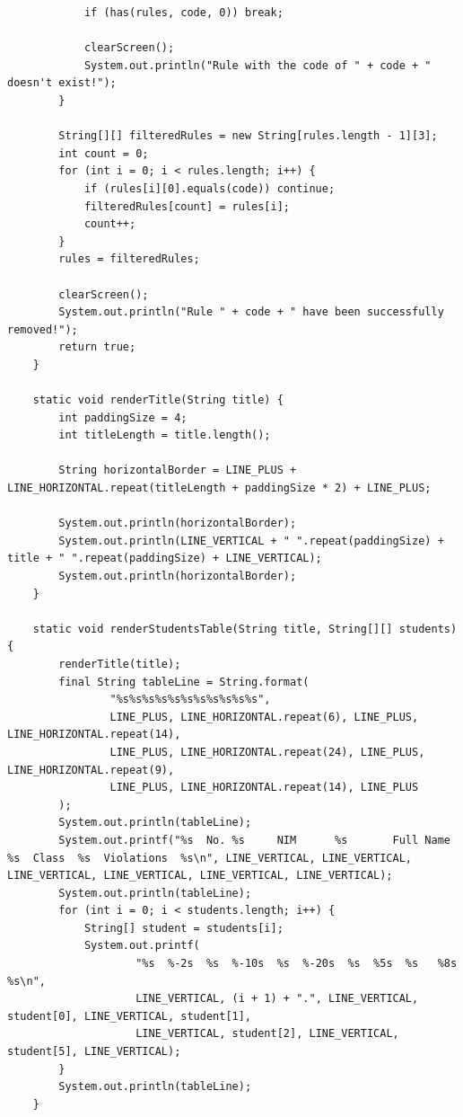 \documentclass[12pt,titlepage]{article}
\begin{document}
\begin{verbatim}
            if (has(rules, code, 0)) break;

            clearScreen();
            System.out.println("Rule with the code of " + code + " doesn't exist!");
        }

        String[][] filteredRules = new String[rules.length - 1][3];
        int count = 0;
        for (int i = 0; i < rules.length; i++) {
            if (rules[i][0].equals(code)) continue;
            filteredRules[count] = rules[i];
            count++;
        }
        rules = filteredRules;

        clearScreen();
        System.out.println("Rule " + code + " have been successfully removed!");
        return true;
    }

    static void renderTitle(String title) {
        int paddingSize = 4;
        int titleLength = title.length();

        String horizontalBorder = LINE_PLUS + LINE_HORIZONTAL.repeat(titleLength + paddingSize * 2) + LINE_PLUS;

        System.out.println(horizontalBorder);
        System.out.println(LINE_VERTICAL + " ".repeat(paddingSize) + title + " ".repeat(paddingSize) + LINE_VERTICAL);
        System.out.println(horizontalBorder);
    }

    static void renderStudentsTable(String title, String[][] students) {
        renderTitle(title);
        final String tableLine = String.format(
                "%s%s%s%s%s%s%s%s%s%s%s",
                LINE_PLUS, LINE_HORIZONTAL.repeat(6), LINE_PLUS, LINE_HORIZONTAL.repeat(14),
                LINE_PLUS, LINE_HORIZONTAL.repeat(24), LINE_PLUS, LINE_HORIZONTAL.repeat(9),
                LINE_PLUS, LINE_HORIZONTAL.repeat(14), LINE_PLUS
        );
        System.out.println(tableLine);
        System.out.printf("%s  No. %s     NIM      %s       Full Name        %s  Class  %s  Violations  %s\n", LINE_VERTICAL, LINE_VERTICAL, LINE_VERTICAL, LINE_VERTICAL, LINE_VERTICAL, LINE_VERTICAL);
        System.out.println(tableLine);
        for (int i = 0; i < students.length; i++) {
            String[] student = students[i];
            System.out.printf(
                    "%s  %-2s  %s  %-10s  %s  %-20s  %s  %5s  %s   %8s   %s\n",
                    LINE_VERTICAL, (i + 1) + ".", LINE_VERTICAL, student[0], LINE_VERTICAL, student[1],
                    LINE_VERTICAL, student[2], LINE_VERTICAL, student[5], LINE_VERTICAL);
        }
        System.out.println(tableLine);
    }


\end{verbatim}
\end{document}
